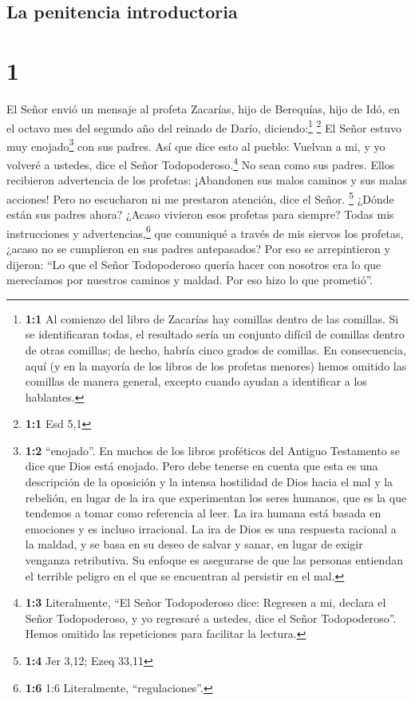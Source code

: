 \hypertarget{la-penitencia-introductoria}{%
\subsection{La penitencia
introductoria}\label{la-penitencia-introductoria}}

\hypertarget{section}{%
\section{1}\label{section}}

 El Señor envió un mensaje al profeta Zacarías, hijo de
Berequías, hijo de Idó, en el octavo mes del segundo año del reinado de
Darío, diciendo:\footnote{\textbf{1:1} Al comienzo del libro de Zacarías
  hay comillas dentro de las comillas. Si se identificaran todas, el
  resultado sería un conjunto difícil de comillas dentro de otras
  comillas; de hecho, habría cinco grados de comillas. En consecuencia,
  aquí (y en la mayoría de los libros de los profetas menores) hemos
  omitido las comillas de manera general, excepto cuando ayudan a
  identificar a los hablantes.} \footnote{\textbf{1:1} Esd 5,1}
 El Señor estuvo muy enojado\footnote{\textbf{1:2}
  ``enojado''. En muchos de los libros proféticos del Antiguo Testamento
  se dice que Dios está enojado. Pero debe tenerse en cuenta que esta es
  una descripción de la oposición y la intensa hostilidad de Dios hacia
  el mal y la rebelión, en lugar de la ira que experimentan los seres
  humanos, que es la que tendemos a tomar como referencia al leer. La
  ira humana está basada en emociones y es incluso irracional. La ira de
  Dios es una respuesta racional a la maldad, y se basa en su deseo de
  salvar y sanar, en lugar de exigir venganza retributiva. Su enfoque es
  asegurarse de que las personas entiendan el terrible peligro en el que
  se encuentran al persistir en el mal.} con sus padres. 
Así que dice esto al pueblo: Vuelvan a mi, y yo volveré a ustedes, dice
el Señor Todopoderoso.\footnote{\textbf{1:3} Literalmente, ``El Señor
  Todopoderoso dice: Regresen a mi, declara el Señor Todopoderoso, y yo
  regresaré a ustedes, dice el Señor Todopoderoso''. Hemos omitido las
  repeticiones para facilitar la lectura.}  No sean como
sus padres. Ellos recibieron advertencia de los profetas: ¡Abandonen sus
malos caminos y sus malas acciones! Pero no escucharon ni me prestaron
atención, dice el Señor. \footnote{\textbf{1:4} Jer 3,12; Ezeq 33,11}
 ¿Dónde están sus padres ahora? ¿Acaso vivieron esos
profetas para siempre?  Todas mis instrucciones y
advertencias,\footnote{\textbf{1:6} 1:6 Literalmente, ``regulaciones''.}
que comuniqué a través de mis siervos los profetas, ¿acaso no se
cumplieron en sus padres antepasados? Por eso se arrepintieron y
dijeron: ``Lo que el Señor Todopoderoso quería hacer con nosotros era lo
que merecíamos por nuestros caminos y maldad. Por eso hizo lo que
prometió''.

